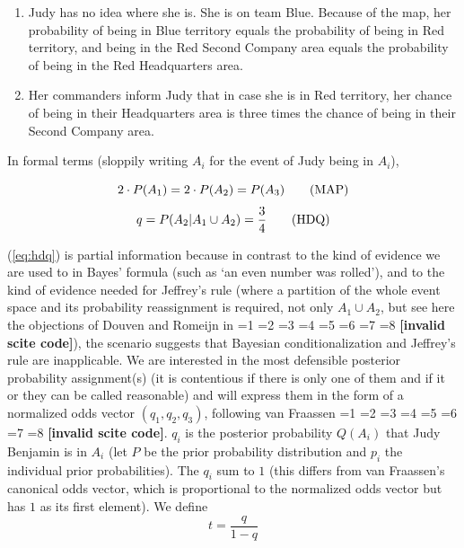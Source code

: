 \documentclass[12pt]{article}
\newcommand{\qnull}[1]{`#1'}
\newif\ifNumericalOrYear
\newcommand{\PageP}{p.~}
\newcommand{\PageP}{}
\newcommand{\scite}[3]{\ifnum#1=1\ifNumericalOrYear\citep{#2}\else\citeyearpar{#2}\fi\else
\ifnum#1=2\ifNumericalOrYear\citep[#3]{#2}\else\citep[{\PageP}#3]{#2}\fi\else
\ifnum#1=3\ifNumericalOrYear(\citet[#3]{#2})\else\citep[{\PageP}#3]{#2}\fi\else
\ifnum#1=4\ifNumericalOrYear\citet{#2}\else\citet{#2}\fi\else
\ifnum#1=5\ifNumericalOrYear(\citet{#2})\else\citep{#2}\fi\else
\ifnum#1=6\ifNumericalOrYear(\citet[#3]{#2})\else\citep[{\PageP}#3]{#2}\fi\else
\ifnum#1=7\ifNumericalOrYear\citep{#2}\else\citealp{#2}\fi\else
\ifnum#1=8\ifNumericalOrYear\citep[#3]{#2}\else\citealp[{\PageP}#3]{#2}\fi\else
\textbf{[invalid scite code]}\fi\fi\fi\fi\fi\fi\fi\fi}
\begin{document}
\begin{enumerate}
\item[({\ref{eq:map}})] Judy has no idea where she is. She is on team Blue.
  Because of the map, her probability of being in Blue territory
  equals the probability of being in Red territory, and being in the Red
  Second Company area equals the probability of being in the Red
  Headquarters area.
\item[({\ref{eq:hdq}})] Her commanders inform Judy that in case she is in Red
  territory, her chance of being in their Headquarters area is three
  times the chance of being in their Second Company area.
\end{enumerate}

In formal terms (sloppily writing $A_{i}$ for the event of Judy being
in $A_{i}$),

\begin{equation}
  \label{eq:map}
  2\cdot{}P(A_{1})=2\cdot{}P(A_{2})=P(A_{3})\tag{\mbox{MAP}}
\end{equation}
\begin{equation}
  \label{eq:hdq}
  q=P(A_{2}|A_{1}\cup{}A_{2})=\frac{3}{4}\tag{\mbox{HDQ}}
\end{equation}

({\ref{eq:hdq}}) is partial information because in contrast to the
kind of evidence we are used to in Bayes' formula (such as \qnull{an
  even number was rolled}), and to the kind of evidence needed for
Jeffrey's rule (where a partition of the whole event space and its
probability reassignment is required, not only $A_{1}\cup{}A_{2}$, but
see here the objections of Douven and Romeijn in
\scite{7}{douvenromeijn09}{}), the scenario suggests that Bayesian
conditionalization and Jeffrey's rule are inapplicable. We are
interested in the most defensible posterior probability assignment(s)
(it is contentious if there is only one of them and if it or they can
be called reasonable) and will express them in the form of a
normalized odds vector $(q_{1},q_{2},q_{3})$, following van Fraassen
\scite{1}{fraassen81}{}. $q_{i}$ is the posterior probability
$Q(A_{i})$ that Judy Benjamin is in $A_{i}$ (let $P$ be the prior
probability distribution and $p_{i}$ the individual prior
probabilities). The $q_{i}$ sum to $1$ (this differs from van
Fraassen's canonical odds vector, which is proportional to the
normalized odds vector but has $1$ as its first element). We define
\begin{displaymath}
  t=\frac{q}{1-q}
\end{displaymath}
\end{document}
